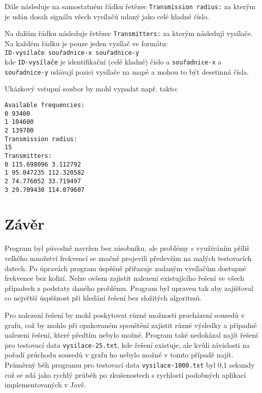 \documentclass[12pt]{report}
\begin{document}
Dále následuje na samostatném řádku řetězec \texttt{Transmission radius:} za kterým je udán dosah signálu všech vysílačů udaný jako celé kladné číslo.

Na dalším řádku následuje řetězec \texttt{Transmitters:} za kterým následují vysílače. Na každém řádku je pouze jeden vysílač ve formátu:\\
\texttt{ID-vysílače souřadnice-x souřadnice-y}\\
kde \texttt{ID-vysílače} je identifikační (celé kladné) číslo a \texttt{souřadnice-x} a \\ \texttt{souřadnice-y} udávají pozici vysílače na mapě a mohou to být desetinná čísla.

Ukázkový vstupní soubor by mohl vypadat např. takto:

\texttt{Available frequencies:\\
0 93400\\
1 104600\\
2 139700\\
Transmission radius:\\
15\\
Transmitters:\\
0 115.698096 3.112792\\
1 95.047235 112.320582\\
2 74.776052 33.719497\\
3 29.709430 114.079607}

\chapter{Závěr}
Program byl původně navržen bez zásobníku, ale problémy s využíváním příliš velkého množství frekvencí se značně projevili především na malých testovacích datech. Po úpravách program úspěšně přiřazuje zadaným vysílačům dostupné frekvence bez kolizí. Nelze ovšem zajistit nalezení existujícího řešení ve všech případech z podstaty daného problému. Program byl upraven tak aby zajišťoval co největší úspěšnost při hledání řešení bez složitých algoritmů. 

Pro nalezení řešení by mohl poskytovat různé možnosti procházení sousedů v grafu, což by mohlo při opakovaném spouštění zajistit různé výsledky a případné nalezení řešení, které předtím nebylo možné. Program také nedokázal najít řešení pro testovací data \texttt{vysilace-25.txt}, kde řešení existuje, ale kvůli závislosti na pořadí průchodu sousedů v grafu ho nebylo možné v tomto případě najít. Průměrný běh programu pro testovací data \texttt{vysilace-1000.txt} byl 0,1 sekundy což se zdá jako rychlý průběh po zkušenostech s rychlostí podobných aplikací implementovaných v Javě.
\end{document}
